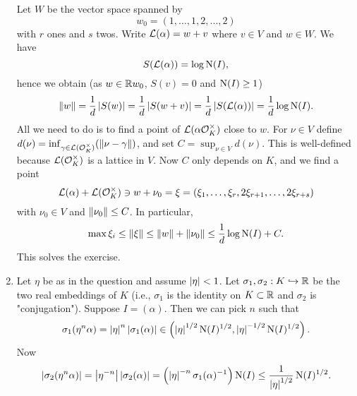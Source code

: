 \documentclass[a4paper,11pt]{article}
\begin{document}
\begin{enumerate}[wide, labelindent=0pt]
        Let $W$ be the vector space spanned by 
        \begin{equation*}
            w_0 =  (1,\dots,1,2, \dots, 2)
        \end{equation*}
        with $r$ ones and $s$ twos.
        Write $\mathcal{L}(\alpha) = w + v$ where
        $v \in V$ and $w \in W$. We have 
        \begin{equation*}
            S(\mathcal{L}(\alpha)) = \log \operatorname{N}(I),
        \end{equation*}
        hence we obtain (as $w \in \mathbb{R} w_0$, $S(v) = 0$ and $\operatorname{N}(I) \geq 1$)
        $$\lVert w\rVert = \frac 1{d} \left\lvert S(w) \right\rvert 
        = \frac 1d \left\lvert S(w+v) \right\rvert = \frac 1d \left\lvert S(\mathcal{L}(\alpha)) \right\rvert = \frac 1d \log \operatorname{N}(I).$$
        All we need to do is to find a point of $\mathcal{L}(\alpha \mathcal{O}_K^\times)$
        close to $w$. For $\nu \in V$ define $d(\nu) = \inf_{\gamma \in \mathcal{L}(\mathcal{O}_K^\times)}
        (\lVert\nu-\gamma\rVert)$, and set $C = \sup_{\nu \in V} d(\nu)$. This 
        is well-defined because $\mathcal{L}(\mathcal{O}_K^\times)$ is a lattice in $V$.
        Now $C$ only depends on $K$, and we find a point 
        $$\mathcal{L}(\alpha) + \mathcal{L}(\mathcal{O}_K^\times) \ni w + \nu_0 = \xi = (\xi_1,\dots, \xi_r,
        2\xi_{r+1},\dots, 2\xi_{r+s})$$
        with $\nu_0 \in V$ and $\lVert\nu_0\rVert \leq C$. In particular,
        \begin{equation*}
        \max \xi_i \leq \lVert\xi\rVert \leq \lVert w\rVert + \lVert\nu_0\rVert \leq
        \frac 1d \log \operatorname{N}(I) + C.
        \end{equation*}
        This solves the exercise.
        
    \item Let $\eta$ be as in the question and assume $\left\lvert \eta \right\rvert < 1$. Let
        $\sigma_1, \sigma_2: K \hookrightarrow \mathbb{R}$ be the two real embeddings of $K$ (i.e., 
        $\sigma_1$ is the identity on $K \subset \mathbb{R}$ and $\sigma_2$ is "conjugation").
        Suppose $I = (\alpha)$. Then we can pick $n$ such that 
        \begin{equation*}
            \sigma_1(\eta^n \alpha) = \left\lvert \eta \right\rvert^n \left\lvert \sigma_1(\alpha) \right\rvert
            \in \left(\left\lvert \eta \right\rvert^{1/2} \operatorname{N}(I)^{1/2}, \left\lvert \eta \right\rvert^{-1/2}
            \operatorname{N}(I)^{1/2}\right).
        \end{equation*}
        Now 
        \begin{equation*}
            \left\lvert \sigma_2(\eta^n \alpha) \right\rvert = \left\lvert \eta^{-n} \right\rvert \left\lvert \sigma_2(\alpha) \right\rvert
            = \left( \left\lvert \eta \right\rvert^{-n} \sigma_1(\alpha)^{-1} \right) \operatorname{N}(I)
                \leq \frac 1{\left\lvert \eta \right\rvert^{1/2}} \operatorname{N}(I)^{1/2}.
        \end{equation*}


\end{enumerate}
\end{document}
